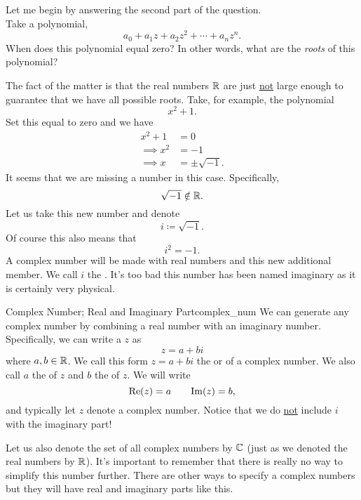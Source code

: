         \begin{answer}
        Let me begin by answering the second part of the question.\\

        \noindent Take a polynomial,
        \[
        a_0+a_1 z + a_2 z^2 + \cdots + a_n z^n.
        \]
        When does this polynomial equal zero?  In other words, what are the \emph{roots} of this polynomial?

        The fact of the matter is that the real numbers $\mathbb{R}$ are just \underline{not} large enough to guarantee that we have all possible roots. Take, for example, the polynomial
        \[
        x^2+1.
        \]
        Set this equal to zero and we have
        \begin{align*}
            x^2+1&=0\\
            \implies x^2&=-1\\
            \implies x&=\pm \sqrt{-1}.
        \end{align*}
        It seems that we are missing a number in this case.  Specifically,
        \[
        \sqrt{-1}\notin \mathbb{R}.
        \]
        Let us take this new number and denote
        \[
        i\coloneqq\sqrt{-1}.
        \]
        Of course this also means that
        \[
        i^2=-1.
        \]
        A complex number will be made with real numbers and this new additional member. We call $i$ the .  It's too bad this number has been named imaginary as it is certainly very physical.
        \end{answer}

        \begin{df}{Complex Number; Real and Imaginary Part}{complex_num}
        We can generate any complex number by combining a real number with an imaginary number. Specifically, we can write a  $z$ as
        \[
        z=a+bi
        \]
        where $a,b\in \mathbb{R}$. We call this form $z=a+bi$ the  or  of a complex number. We also call $a$ the  of $z$ and $b$ the  of $z$.  We will write
        \[
        \mathrm{Re}(z)=a \qquad \mathrm{Im}(z)=b,
        \]
        and typically let $z$ denote a complex number. Notice that we do \underline{not} include $i$ with the imaginary part!
        \end{df}

        \noindent Let us also denote the set of all complex numbers by $\mathbb{C}$ (just as we denoted the real numbers by $\mathbb{R}$). It's important to remember that there is really no way to simplify this number further. There are other ways to specify a complex numbers but they will have real and imaginary parts like this.


